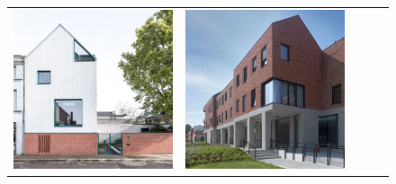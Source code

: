\begin{figure}[H]
{\begin{tabular}{@{}ccccc@{}}
      \includegraphics[width=\linewidth]{Images/LoRAs/Plintwerking/Training_images/3.jpg} &
      \includegraphics[width=\linewidth]{Images/LoRAs/Plintwerking/Training_images/4.jpeg} &

\end{tabular}}
\end{figure}
